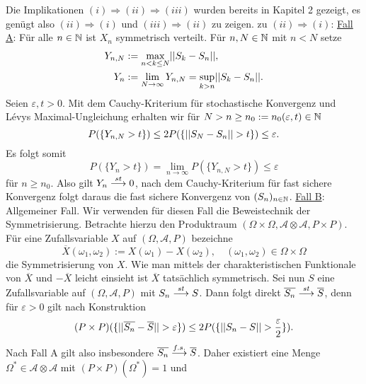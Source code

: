 \begin{proof*}%
    Die Implikationen $(i) \Rightarrow (ii) \Rightarrow (iii)$ wurden bereits in Kapitel 2 gezeigt, es genügt also $(ii) \Rightarrow (i)$ und $(iii) \Rightarrow (ii)$ zu zeigen. 
    \newline 
    zu $(ii) \Rightarrow (i)$: \underline{Fall A}: Für alle $n \in \mathbb{N}$ ist $X_n$ symmetrisch verteilt. 
    \newline 
    Für $n, N \in \mathbb{N}$ mit $n < N$ setze 
    \begin{align*}
        Y_{n,N} &:= \max_{n < k \leq N}\lvert\lvert S_k - S_n \rvert\rvert, \\\
        Y_n     &:= \lim_{N \to \infty} Y_{n,N} = \sup_{k > n} \lvert\lvert S_k - S_n \rvert\rvert. 
    \end{align*}
    Seien $\varepsilon, t > 0$. Mit dem Cauchy-Kriterium für stochastische Konvergenz und Lévys Maximal-Ungleichung erhalten wir für $N > n \geq n_0 := n_0(\varepsilon,t) \in \mathbb{N}$
    $$
        P(\{ Y_{n, N} > t\}) \leq 2P(\{ \lvert\lvert S_N - S_n \rvert\rvert > t\}) \leq \varepsilon . 
    $$
    Es folgt somit 
    $$
        P(\{Y_n > t \}) = \lim_{n \to \infty}P(\{Y_{n,N} > t \}) \leq \varepsilon
    $$
    für $n \geq n_0$. Also gilt $Y_n \overset{st}{\longrightarrow} 0$, nach dem Cauchy-Kriterium für fast sichere Konvergenz folgt daraus die fast sichere Konvergenz von $(S_n)_{n \in \mathbb{N}}$. 
    \newline \underline{Fall B}: Allgemeiner Fall.
    \newline 
    Wir verwenden für diesen Fall die Beweistechnik der Symmetrisierung.  
    Betrachte hierzu den Produktraum $(\Omega \times \Omega, \mathcal{A}\otimes\mathcal{A}, P \times P)$. Für eine Zufallsvariable $X$ auf $(\Omega, \mathcal{A}, P)$ bezeichne
    $$
        \overline{X}(\omega_1, \omega_2) := X(\omega_1) - X(\omega_2), \quad (\omega_1, \omega_2) \in \Omega \times \Omega
    $$   
    die Symmetrisierung von $X$. Wie man mittels der charakteristischen Funktionale von $\overline{X}$ und $-\overline{X}$ leicht einsieht ist $\overline{X}$ tatsächlich symmetrisch. 
    Sei nun $S$ eine Zufallsvariable auf $(\Omega, \mathcal{A}, P)$ mit $S_n \overset{st}{\longrightarrow} S$. 
    Dann folgt direkt $\overline{S_n} \overset{st}{\longrightarrow} \overline{S}$, denn für $\varepsilon > 0$ gilt nach Konstruktion
    $$
        (P\times P)(\{ \lvert\lvert \overline{S_n} - \overline{S} \rvert\rvert > \varepsilon \} ) \leq 2P(\{ \lvert\lvert S_n - S \rvert\rvert > \frac{\varepsilon}{2} \}).
    $$
    Nach Fall A gilt also insbesondere $\overline{S_n} \overset{f.s.}{\longrightarrow}  \overline{S}$. Daher existiert eine Menge $\Omega^* \in \mathcal{A}\otimes\mathcal{A}$ mit \mbox{$(P\times P)(\Omega^*) = 1$} und

\end{proof*}
